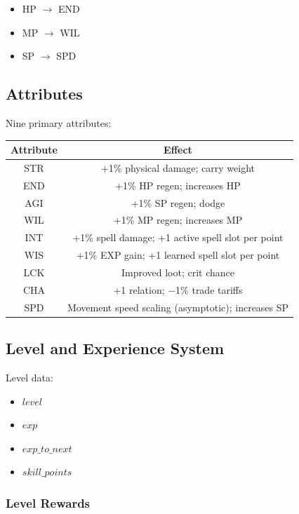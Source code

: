 \begin{itemize}
\item HP $\rightarrow$ END
\item MP $\rightarrow$ WIL
\item SP $\rightarrow$ SPD
\end{itemize}



\subsection{Attributes}

Nine primary attributes:

\begin{table}[H]
\centering
\begin{tabular}{|c|c|}
\hline
Attribute & Effect \\
\hline
STR & +1\% physical damage; carry weight \\
END & +1\% HP regen; increases HP \\
AGI & +1\% SP regen; dodge \\
WIL & +1\% MP regen; increases MP \\
INT & +1\% spell damage; +1 active spell slot per point \\
WIS & +1\% EXP gain; +1 learned spell slot per point \\
LCK & Improved loot; crit chance \\
CHA & +1 relation; −1\% trade tariffs \\
SPD & Movement speed scaling (asymptotic); increases SP \\
\hline
\end{tabular}
\end{table}

\subsection{Level and Experience System}

Level data:

\begin{itemize}
\item $level$
\item $exp$
\item $exp\_to\_next$
\item $skill\_points$
\end{itemize}

\subsubsection{Level Rewards}

